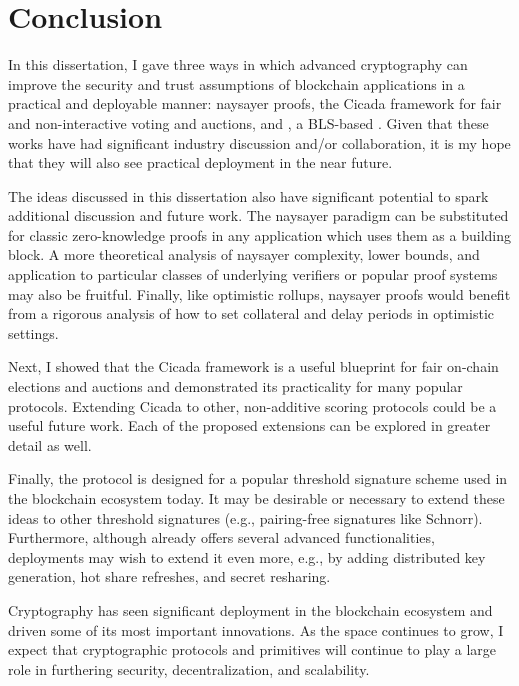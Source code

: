 \chapter{Conclusion}\label{sec:conclusion}

In this dissertation, I gave three ways in which advanced cryptography can improve the security and trust assumptions of blockchain applications in a practical and deployable manner: naysayer proofs, the Cicada framework for fair and non-interactive voting and auctions, and \sysname, a BLS-based \hcwl. Given that these works have had significant industry discussion and/or collaboration, it is my hope that they will also see practical deployment in the near future. 

The ideas discussed in this dissertation also have significant potential to spark additional discussion and future work. The naysayer paradigm can be substituted for classic zero-knowledge proofs in any application which uses them as a building block. A more theoretical analysis of naysayer complexity, lower bounds, and application to particular classes of underlying verifiers or popular proof systems may also be fruitful. Finally, like optimistic rollups, naysayer proofs would benefit from a rigorous analysis of how to set collateral and delay periods in optimistic settings.

Next, I showed that the Cicada framework is a useful blueprint for fair on-chain elections and auctions and demonstrated its practicality for many popular protocols. Extending Cicada to other, non-additive scoring protocols could be a useful future work. Each of the proposed extensions can be explored in greater detail as well.

Finally, the \hcwl protocol \sysname is designed for a popular threshold signature scheme
used in the blockchain ecosystem today. It may be desirable or necessary to extend these ideas to other threshold signatures (e.g., pairing-free signatures like Schnorr). Furthermore, although \sysname already offers several advanced functionalities, deployments may wish to extend it even more, e.g., by adding distributed key generation, hot share refreshes, and secret resharing.

Cryptography has seen significant deployment in the blockchain ecosystem and driven some of its most important innovations. As the space continues to grow, I expect that cryptographic protocols and primitives will continue to play a large role in furthering security, decentralization, and scalability.
